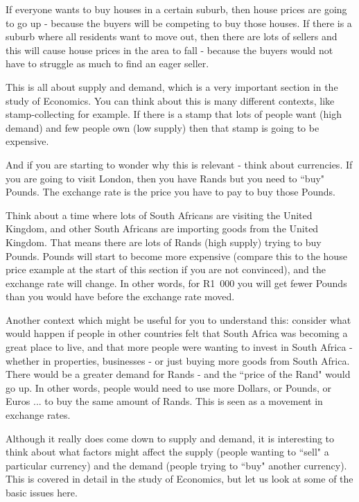         
        \label{m39335*id68515}If everyone wants to buy houses in a certain suburb, then house prices are going to go up - because the buyers will be competing to buy those houses. If there is a suburb where all residents want to move out, then there are lots of sellers and this will cause house prices in the area to fall - because the buyers would not have to struggle as much to find an eager seller.\par 
        \label{m39335*id68522}This is all about supply and demand, which is a very important section in the study of Economics. You can think about this is many different contexts, like stamp-collecting for example. If there is a stamp that lots of people want (high demand) and few people own (low supply) then that stamp is going to be expensive.\par 
        \label{m39335*id68528}And if you are starting to wonder why this is relevant - think about currencies. If you are going to visit London, then you have Rands but you need to ``buy" Pounds. The exchange rate is the price you have to pay to buy those Pounds.\par 
        \label{m39335*id68535}Think about a time where lots of South Africans are visiting the United Kingdom, and other South Africans are importing goods from the United Kingdom. That means there are lots of Rands (high supply) trying to buy Pounds. Pounds will start to become more expensive (compare this to the house price example at the start of this section if you are not convinced), and the exchange rate will change. In other words, for R1~000 you will get fewer Pounds than you would have before the exchange rate moved.\par 
        \label{m39335*id68547}Another context which might be useful for you to understand this: consider what would happen if people in other countries felt that South Africa was becoming a great place to live, and that more people were wanting to invest in South Africa - whether in properties, businesses - or just buying more goods from South Africa. There would be a greater demand for Rands - and the ``price of the Rand" would go up. In other words, people would need to use more Dollars, or Pounds, or Euros ... to buy the same amount of Rands. This is seen as a movement in exchange rates.\par 
        \label{m39335*id68560}Although it really does come down to supply and demand, it is interesting to think about what factors might affect the supply (people wanting to ``sell" a particular currency) and the demand (people trying to ``buy" another currency). This is covered in detail in the study of Economics, but let us look at some of the basic issues here.\par 
